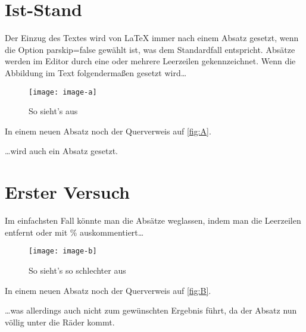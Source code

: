 \documentclass[english,ngerman]{tudscrartcl}
\begin{document}
\section{Ist-Stand}
Der Einzug des Textes wird von LaTeX immer nach einem Absatz gesetzt, wenn die 
Option parskip=false gewählt ist, was dem Standardfall entspricht. Absätze 
werden im Editor durch eine oder mehrere Leerzeilen gekennzeichnet. Wenn die 
Abbildung im Text folgendermaßen gesetzt wird\dots
%
\begin{quoting}\univrn\color{cdgrey}
\begin{Tutorial}
\blindtext

\begin{figure}[h]
\centering
\texttt{[image: image-a]}
\caption{So sieht's aus}
\label{fig:A}
\end{figure}

\blindtext

In einem neuen Absatz noch der Querverweis auf \autoref{fig:A}.
\end{Tutorial}
\end{quoting}
%
\dots wird auch ein Absatz gesetzt.


\clearpage
\section{Erster Versuch}
Im einfachsten Fall könnte man die Absätze weglassen, indem man die Leerzeilen 
entfernt oder mit \% auskommentiert\dots
%
\begin{quoting}\univrn\color{cdgrey}
\begin{Tutorial}
\blindtext
%
\begin{figure}[h]
\centering
\texttt{[image: image-b]}
\caption{So sieht's so schlechter aus}
\label{fig:B}
\end{figure}
%
\blindtext

In einem neuen Absatz noch der Querverweis auf \autoref{fig:B}.
\end{Tutorial}
\end{quoting}
%
\dots was allerdings auch nicht zum gewünschten Ergebnis führt, da der Absatz 
nun völlig unter die Räder kommt.

\clearpage
\end{document}
